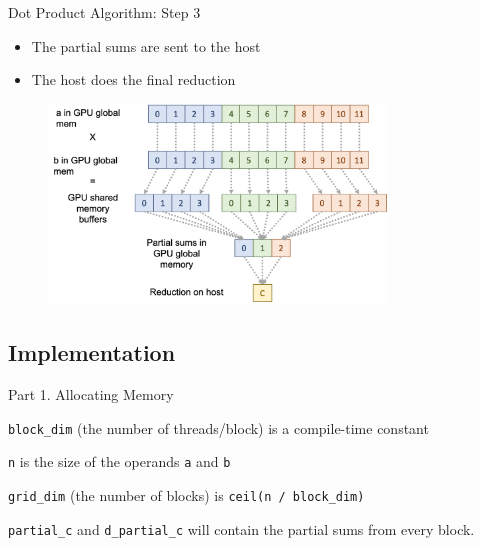 \documentclass{beamer}
\begin{document}
    \begin{frame}{Dot Product Algorithm: Step 3}
        \begin{itemize}
            \item The partial sums are sent to the host
            \item The host does the final reduction
        \end{itemize}
        \begin{figure}
            \centering
            \includegraphics[width=0.8\textwidth]{img/04/dot-03.png}
        \end{figure}
    \end{frame}
    
    \subsection{Implementation}

    \begin{frame}{Part 1. Allocating Memory}
            \begin{itemize}
            {\footnotesize
                \item \texttt{block\_dim} (the number of threads/block) is a compile-time constant
                \item \texttt{n} is the size of the operands \texttt{a} and \texttt{b}
                \item \texttt{grid\_dim} (the number of blocks) is \texttt{ceil(n / block\_dim)}
                \item \texttt{partial\_c} and \texttt{d\_partial\_c} will contain the partial sums from every block.
            }
            \end{itemize}
            \begin{block}{}
                \inputminted[fontsize=\footnotesize]{cuda}{src/dot_snippet_01.cu}
            \end{block}
    \end{frame}
\end{document}
